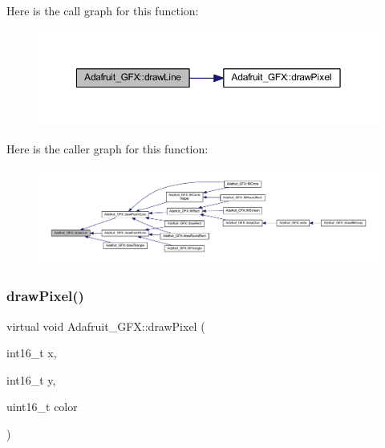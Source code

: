 Here is the call graph for this function\+:
\nopagebreak
\begin{figure}[H]
\begin{center}
\leavevmode
\includegraphics[width=350pt]{d9/d97/class_adafruit___g_f_x_aa0ff662c2b2b48c3bac51f98c777776d_cgraph}
\end{center}
\end{figure}
Here is the caller graph for this function\+:
\nopagebreak
\begin{figure}[H]
\begin{center}
\leavevmode
\includegraphics[width=350pt]{d9/d97/class_adafruit___g_f_x_aa0ff662c2b2b48c3bac51f98c777776d_icgraph}
\end{center}
\end{figure}
\mbox{\label{class_adafruit___g_f_x_ab7fbf72885c873266f9c7eb53b5c8896}} 
\subsubsection{\texorpdfstring{draw\+Pixel()}{drawPixel()}}
{\footnotesize\ttfamily virtual void Adafruit\+\_\+\+G\+F\+X\+::draw\+Pixel (\begin{DoxyParamCaption}\item[{int16\+\_\+t}]{x,  }\item[{int16\+\_\+t}]{y,  }\item[{uint16\+\_\+t}]{color }\end{DoxyParamCaption})\hspace{0.3cm}{\ttfamily [pure virtual]}}



